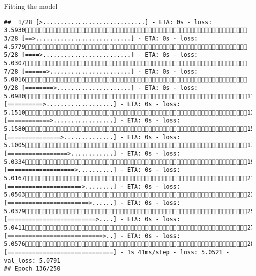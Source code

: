 \documentclass[
  ignorenonframetext,
]{beamer}
\begin{document}
\begin{frame}[fragile]{Fitting the model}
\begin{verbatim}
##  1/28 [>.............................] - ETA: 0s - loss: 3.5930 3/28 [==>...........................] - ETA: 0s - loss: 4.5779 5/28 [====>.........................] - ETA: 0s - loss: 5.0307 7/28 [======>.......................] - ETA: 0s - loss: 5.0016 9/28 [========>.....................] - ETA: 0s - loss: 5.098011/28 [==========>...................] - ETA: 0s - loss: 5.151013/28 [============>.................] - ETA: 0s - loss: 5.158015/28 [===============>..............] - ETA: 0s - loss: 5.100517/28 [=================>............] - ETA: 0s - loss: 5.033419/28 [===================>..........] - ETA: 0s - loss: 5.016721/28 [=====================>........] - ETA: 0s - loss: 5.050323/28 [=======================>......] - ETA: 0s - loss: 5.037925/28 [=========================>....] - ETA: 0s - loss: 5.041127/28 [===========================>..] - ETA: 0s - loss: 5.057628/28 [==============================] - 1s 41ms/step - loss: 5.0521 - val_loss: 5.0791
## Epoch 136/250

\end{verbatim}
\end{frame}
\end{document}
